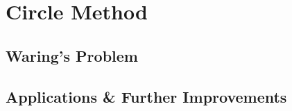 
\section{Circle Method}

\subsection{Waring's Problem}




\subsection{Applications \& Further Improvements}

